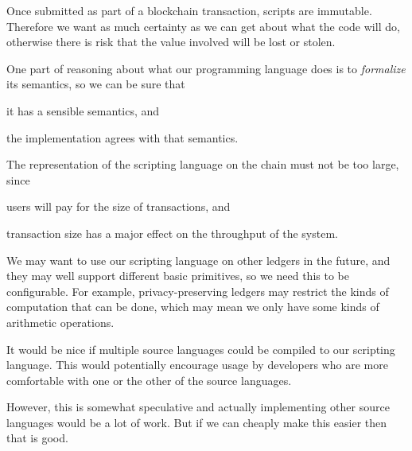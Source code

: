 \begin{requirement}[Safety]
\label{req:script-lang-reasoning}
Once submitted as part of a blockchain transaction, scripts are immutable.
Therefore we want as much certainty as we can get about what the code will do, otherwise there is risk that the value involved will be lost or stolen.
\end{requirement}

\begin{requirement}[Formalization]
\label{req:script-lang-formalization}
One part of reasoning about what our programming language does is to \emph{formalize} its semantics, so we can be sure that
\begin{inparaenum}
  \item it has a sensible semantics, and
  \item the implementation agrees with that semantics.
\end{inparaenum}
\end{requirement}

\begin{requirement}[Size]
\label{req:script-lang-size}
The representation of the scripting language on the chain must not be too large, since
\begin{inparaenum}
\item users will pay for the size of transactions, and
\item transaction size has a major effect on the throughput of the system.
\end{inparaenum}
\end{requirement}

\begin{requirement}[Extensibility]
\label{req:script-lang-extensibility}
We may want to use our scripting language on other ledgers in the future, and they may well support different basic primitives, so we need this to be configurable.
For example, privacy-preserving ledgers may restrict the kinds of computation that can be done, which may mean we only have some kinds of arithmetic operations.
\end{requirement}

\begin{requirement}
\label{req:source-lang-multiple}
It would be nice if multiple source languages could be compiled to our scripting language.
This would potentially encourage usage by developers who are more comfortable with one or the other of the source languages.

However, this is somewhat speculative and actually implementing other source languages would be a lot of work.
But if we can cheaply make this easier then that is good.
\end{requirement}

